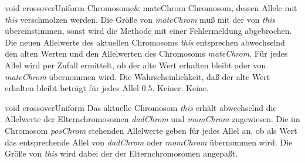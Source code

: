 \documentclass{report}
\begin{document}
\newpage

    \printMethodWithOneParam
    {void} 
    {crossoverUniform}
    {Chromosome\&} 
    {mateChrom} 
    {Chromosom, dessen Allele mit 
    {\em this} verschmolzen werden. Die Gr\"o{\ss}e von {\em mateChrom} mu{\ss} mit der
    von {\em this} \"ubereinstimmen, sonst wird die Methode mit einer
 Fehlermeldung abgebrochen.}
    {Die neuen Allelwerte des aktuellen Chromosoms {\em this}
    entsprechen abwechselnd den alten Werten und den Allelwerten des
    Chromosoms {\em mateChrom}. F\"ur jedes Allel wird per Zufall ermittelt, ob der
    alte Wert erhalten bleibt oder von {\em mateChrom} \"ubernommen wird.
    Die Wahrscheinlichkeit, da{\ss} der alte Wert erhalten bleibt betr\"agt f\"ur
    jedes Allel $0.5$.}
    {Keiner.}
    {Keine.}

\vspace{4ex}

    \setCorrectWidthThree{8pt}
    \printMethodWithParamsSaved
        {void}
        {}
        {crossoverUniform}
        {Das aktuelle Chromosom {\em this} erh\"alt abwechselnd die 
    Allelwerte der Elternchromosomen {\em dadChrom} und {\em momChrom} zugewiesen. Die im Chromosom
    {\em posChrom} stehenden Allelwerte geben f\"ur jedes Allel an, ob als Wert
    das entsprechende Allel von {\em dadChrom} oder {\em momChrom} \"ubernommen wird.
    Die Gr\"o{\ss}e von {\em this} wird dabei der der Elternchromosomen angepa{\ss}t.}
        {}
    \setCorrectWidthThree{4pt}
\end{document}

